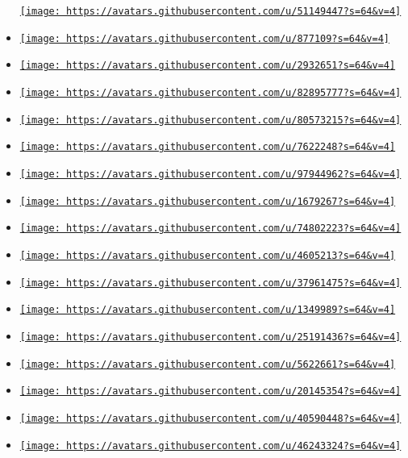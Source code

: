 \begin{itemize}
  \href{https://github.com/SekoiaTree}{\texttt{[image: https://avatars.githubusercontent.com/u/51149447?s=64\&v=4]}}
\item
  \href{https://github.com/asayers}{\texttt{[image: https://avatars.githubusercontent.com/u/877109?s=64\&v=4]}}
\item
  \href{https://github.com/birktj}{\texttt{[image: https://avatars.githubusercontent.com/u/2932651?s=64\&v=4]}}
\item
  \href{https://github.com/frungl}{\texttt{[image: https://avatars.githubusercontent.com/u/82895777?s=64\&v=4]}}
\item
  \href{https://github.com/jinhao-huang}{\texttt{[image: https://avatars.githubusercontent.com/u/80573215?s=64\&v=4]}}
\item
  \href{https://github.com/loewenheim}{\texttt{[image: https://avatars.githubusercontent.com/u/7622248?s=64\&v=4]}}
\item
  \href{https://github.com/lvignoli}{\texttt{[image: https://avatars.githubusercontent.com/u/97944962?s=64\&v=4]}}
\item
  \href{https://github.com/lxndio}{\texttt{[image: https://avatars.githubusercontent.com/u/1679267?s=64\&v=4]}}
\item
  \href{https://github.com/marcoradocchia}{\texttt{[image: https://avatars.githubusercontent.com/u/74802223?s=64\&v=4]}}
\item
  \href{https://github.com/mateusfccp}{\texttt{[image: https://avatars.githubusercontent.com/u/4605213?s=64\&v=4]}}
\item
  \href{https://github.com/ollelogdahl}{\texttt{[image: https://avatars.githubusercontent.com/u/37961475?s=64\&v=4]}}
\item
  \href{https://github.com/samlich}{\texttt{[image: https://avatars.githubusercontent.com/u/1349989?s=64\&v=4]}}
\item
  \href{https://github.com/user202729}{\texttt{[image: https://avatars.githubusercontent.com/u/25191436?s=64\&v=4]}}
\item
  \href{https://github.com/utilForever}{\texttt{[image: https://avatars.githubusercontent.com/u/5622661?s=64\&v=4]}}
\item
  \href{https://github.com/wrenger}{\texttt{[image: https://avatars.githubusercontent.com/u/20145354?s=64\&v=4]}}
\item
  \href{https://github.com/yichenchong}{\texttt{[image: https://avatars.githubusercontent.com/u/40590448?s=64\&v=4]}}
\item
  \href{https://github.com/zrr1999}{\texttt{[image: https://avatars.githubusercontent.com/u/46243324?s=64\&v=4]}}
\end{itemize}

